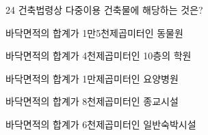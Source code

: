 \begin{question}{24}
건축법령상 다중이용 건축물에 해당하는 것은?
\begin{choices}
  \item 바닥면적의 합계가 1만5천제곱미터인 동물원
  \item 바닥면적의 합계가 4천제곱미터인 10층의 학원
  \item 바닥면적의 합계가 1만제곱미터인 요양병원
  \item 바닥면적의 합계가 8천제곱미터인 종교시설
  \item 바닥면적의 합계가 6천제곱미터인 일반숙박시설
\end{choices}
\end{question}
